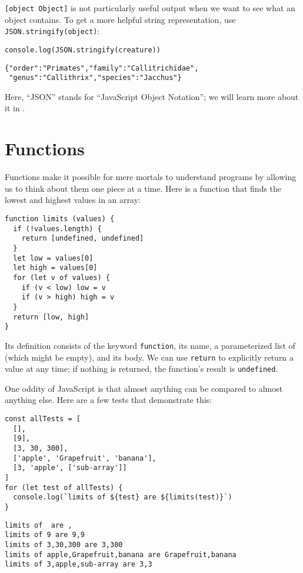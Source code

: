 \texttt{{[}object\ Object{]}} is not particularly useful output when we want to see what an object contains.
To get a more helpful string representation,
use \texttt{JSON.stringify(object)}:

\begin{verbatim}
console.log(JSON.stringify(creature))
\end{verbatim}

\begin{verbatim}
{"order":"Primates","family":"Callitrichidae",
 "genus":"Callithrix","species":"Jacchus"}
\end{verbatim}

Here,
``JSON'' stands for ``JavaScript Object Notation'';
we will learn more about it in .

\section{Functions}\label{s:basics-functions}

Functions make it possible for mere mortals to understand programs
by allowing us to think about them one piece at a time.
Here is a function that finds the lowest and highest values in an array:

\begin{verbatim}
function limits (values) {
  if (!values.length) {
    return [undefined, undefined]
  }
  let low = values[0]
  let high = values[0]
  for (let v of values) {
    if (v < low) low = v
    if (v > high) high = v
  }
  return [low, high]
}
\end{verbatim}

Its definition consists of the keyword \texttt{function},
its name,
a parameterized list of  (which might be empty),
and its body.
We can use \texttt{return} to explicitly return a value at any time;
if nothing is returned,
the function's result is \texttt{undefined}.

One oddity of JavaScript is that almost anything can be compared to almost anything else.
Here are a few tests that demonstrate this:

\begin{verbatim}
const allTests = [
  [],
  [9],
  [3, 30, 300],
  ['apple', 'Grapefruit', 'banana'],
  [3, 'apple', ['sub-array']]
]
for (let test of allTests) {
  console.log(`limits of ${test} are ${limits(test)}`)
}
\end{verbatim}

\begin{verbatim}
limits of  are ,
limits of 9 are 9,9
limits of 3,30,300 are 3,300
limits of apple,Grapefruit,banana are Grapefruit,banana
limits of 3,apple,sub-array are 3,3
\end{verbatim}

